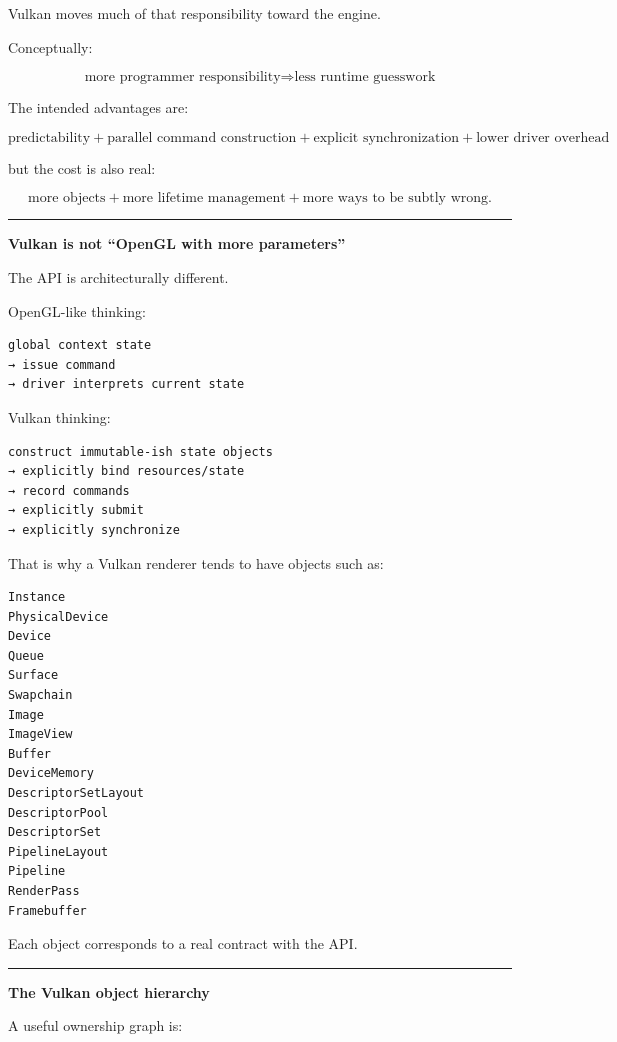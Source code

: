 Vulkan moves much of that responsibility toward the engine.

Conceptually:

\[
\boxed{
\text{more programmer responsibility}
\Longrightarrow
\text{less runtime guesswork}
}
\]

The intended advantages are:

\[
\boxed{
\text{predictability}
+
\text{parallel command construction}
+
\text{explicit synchronization}
+
\text{lower driver overhead}
}
\]

but the cost is also real:

\[
\boxed{
\text{more objects}
+
\text{more lifetime management}
+
\text{more ways to be subtly wrong}.
}
\]

\begin{center}\rule{0.5\linewidth}{0.5pt}\end{center}

\textbf{Vulkan is not ``OpenGL with more parameters''}

The API is architecturally different.

OpenGL-like thinking:

\begin{verbatim}
global context state
→ issue command
→ driver interprets current state
\end{verbatim}

Vulkan thinking:

\begin{verbatim}
construct immutable-ish state objects
→ explicitly bind resources/state
→ record commands
→ explicitly submit
→ explicitly synchronize
\end{verbatim}

That is why a Vulkan renderer tends to have objects such as:

\begin{verbatim}
Instance
PhysicalDevice
Device
Queue
Surface
Swapchain
Image
ImageView
Buffer
DeviceMemory
DescriptorSetLayout
DescriptorPool
DescriptorSet
PipelineLayout
Pipeline
RenderPass
Framebuffer
\end{verbatim}

Each object corresponds to a real contract with the API.

\begin{center}\rule{0.5\linewidth}{0.5pt}\end{center}

\textbf{The Vulkan object hierarchy}

A useful ownership graph is:

